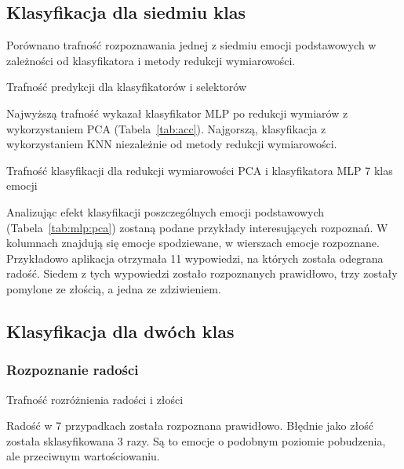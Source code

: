 \documentclass[a4paper,12pt,twoside,openany]{report}
\newcommand{\Tab}[1]{(Tabela~\ref{#1})}
\begin{document}
\subsection{Klasyfikacja dla siedmiu klas}
Porównano trafność rozpoznawania jednej z siedmiu emocji podstawowych w zależności od klasyfikatora i metody redukcji wymiarowości.
\begin{table}[hc!]
	\caption{Trafność predykcji dla klasyfikatorów i selektorów}
	\centering
	
	\label{tab:acc}
\end{table}
Najwyższą trafność wykazał klasyfikator MLP po redukcji wymiarów z wykorzystaniem PCA \Tab{tab:acc}. 
Najgorszą, klasyfikacja z wykorzystaniem KNN niezależnie od metody redukcji wymiarowości.
\begin{landscape}
\begin{table}[hc!]
	\caption{Trafność klasyfikacji dla redukcji wymiarowości PCA i klasyfikatora MLP 7 klas emocji}
	\centering
	
	\label{tab:mlp:pca}
\end{table}
\end{landscape}
Analizując efekt klasyfikacji poszczególnych emocji podstawowych \Tab{tab:mlp:pca} zostaną podane przykłady interesujących rozpoznań.
W kolumnach znajdują się emocje spodziewane, w wierszach emocje rozpoznane.
Przykładowo aplikacja otrzymała 11 wypowiedzi, na których została odegrana radość.
Siedem z tych wypowiedzi zostało rozpoznanych prawidłowo, trzy zostały pomylone ze złością, a jedna ze zdziwieniem.

\subsection{Klasyfikacja dla dwóch klas}
\subsubsection{Rozpoznanie radości}
\begin{table}[hc!]
	\caption{Trafność rozróżnienia radości i złości}
	\centering
	
\end{table}
Radość w 7 przypadkach została rozpoznana prawidłowo. 
Błędnie jako złość została sklasyfikowana 3 razy. 
Są to emocje o podobnym poziomie pobudzenia, ale przeciwnym wartościowaniu.
\end{document}
